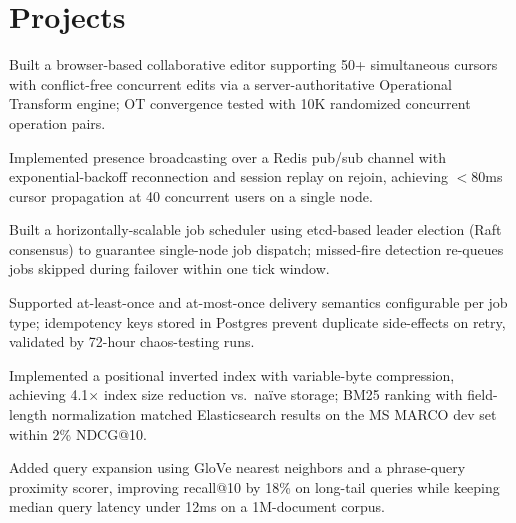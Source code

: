 \section{Projects}

\begin{rlist}
  \item Built a browser-based collaborative editor supporting 50+ simultaneous cursors with conflict-free concurrent edits via a server-authoritative Operational Transform engine; OT convergence tested with 10K randomized concurrent operation pairs.
  \item Implemented presence broadcasting over a Redis pub/sub channel with exponential-backoff reconnection and session replay on rejoin, achieving $<$80ms cursor propagation at 40 concurrent users on a single node.
\end{rlist}

\begin{rlist}
  \item Built a horizontally-scalable job scheduler using etcd-based leader election (Raft consensus) to guarantee single-node job dispatch; missed-fire detection re-queues jobs skipped during failover within one tick window.
  \item Supported at-least-once and at-most-once delivery semantics configurable per job type; idempotency keys stored in Postgres prevent duplicate side-effects on retry, validated by 72-hour chaos-testing runs.
\end{rlist}

\begin{rlist}
  \item Implemented a positional inverted index with variable-byte compression, achieving 4.1$\times$ index size reduction vs.\ na\"{i}ve storage; BM25 ranking with field-length normalization matched Elasticsearch results on the MS MARCO dev set within 2\% NDCG@10.
  \item Added query expansion using GloVe nearest neighbors and a phrase-query proximity scorer, improving recall@10 by 18\% on long-tail queries while keeping median query latency under 12ms on a 1M-document corpus.
\end{rlist}

